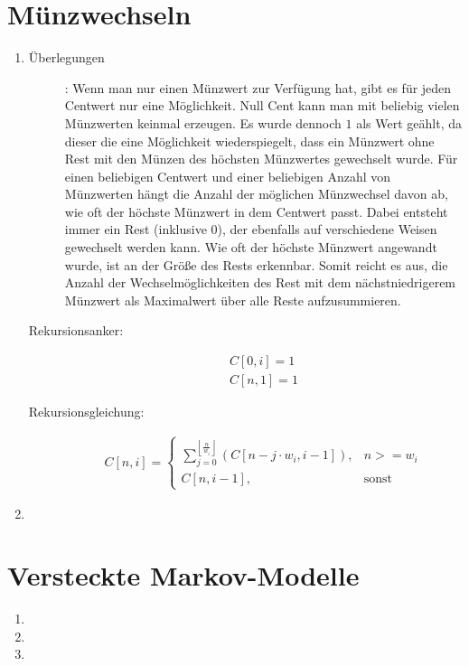 \documentclass[a4paper,10pt]{article}
\begin{document}
\section{Münzwechseln}
\begin{enumerate}
	\item \begin{description}
		\item[Überlegungen]: Wenn man nur einen Münzwert zur Verfügung hat, gibt es für jeden Centwert nur eine Möglichkeit. Null Cent kann man mit beliebig vielen Münzwerten keinmal erzeugen. Es wurde dennoch $1$ als Wert geählt, da dieser die eine Möglichkeit wiederspiegelt, dass ein Münzwert ohne Rest mit den Münzen des höchsten Münzwertes gewechselt wurde. Für einen beliebigen Centwert und einer beliebigen Anzahl von Münzwerten hängt die Anzahl der möglichen Münzwechsel davon ab, wie oft der höchste Münzwert in dem Centwert passt. Dabei entsteht immer ein Rest (inklusive $0$), der ebenfalls auf verschiedene Weisen gewechselt werden kann. Wie oft der höchste Münzwert angewandt wurde, ist an der Größe des Rests erkennbar. Somit reicht es aus, die Anzahl der Wechselmöglichkeiten des Rest mit dem nächstniedrigerem Münzwert als Maximalwert über alle Reste aufzusummieren.
		\item[Rekursionsanker:] \begin{align*}
			C[0,i] = 1\\
			C[n,1] = 1
			\end{align*}
		\item[Rekursionsgleichung:] \begin{align*}
			C[n,i] = \begin{cases}
				\sum\limits_{j=0}^{\left\lfloor\frac{n}{w_i}\right\rfloor}\left( C[n-j\cdot w_i, i-1]\right), & n >=w_i \\
				C[n,i-1], & \text{sonst}
			\end{cases}
			\end{align*}
		\end{description}
	\item
\end{enumerate}

\section{Versteckte Markov-Modelle}
\begin{enumerate}
	\item
	\item
	\item
\end{enumerate}
\end{document}
